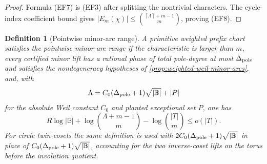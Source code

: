 \documentclass[12pt,a4paper]{amsart}
\numberwithin{equation}{section}
\newtheorem{definition}[definition]{Definition}
\theoremstyle{remark}
\newcommand{\B}{\mathbb B}
\newcommand{\abs}[1]{\lvert #1\rvert}
\newcommand{\ceil}[1]{\left\lceil #1\right\rceil}
\begin{document}
\begin{proof}
Formula \textup{(EF7)} is \textup{(EF3)} after splitting the nontrivial
characters.  The cycle-index coefficient bound gives
\(\abs{E_m(\chi)}\le\binom{\ceil\Lambda+m-1}{m}\), proving
\textup{(EF8)}.
\end{proof}

\begin{definition}[Pointwise minor-arc range]\label{def:prefix-flat-range}
A primitive weighted prefix chart satisfies the pointwise minor-arc range if the characteristic is larger than \(m\), every certified minor lift has a rational phase of total pole-degree at most \(\Delta_{\rm pole}\) and satisfies the nondegeneracy hypotheses of \cref{prop:weighted-weil-minor-arcs}, and, with
\[
        \Lambda=C_0(\Delta_{\rm pole}+1)\sqrt{\abs\B}+\abs P
\]
for the absolute Weil constant \(C_0\) and planted exceptional set \(P\), one has
\[
        \tag{PF}
        R\log\abs\B+
        \log\binom{\Lambda+m-1}{m}
        -\log\binom{\abs T}{m}\le o(\abs T).
\]
For circle twin-cosets the same definition is used with \(2C_0(\Delta_{\rm pole}+1)\sqrt{\abs\B}\) in place of \(C_0(\Delta_{\rm pole}+1)\sqrt{\abs\B}\), accounting for the two inverse-coset lifts on the torus before the involution quotient.
\end{definition}
\end{document}
